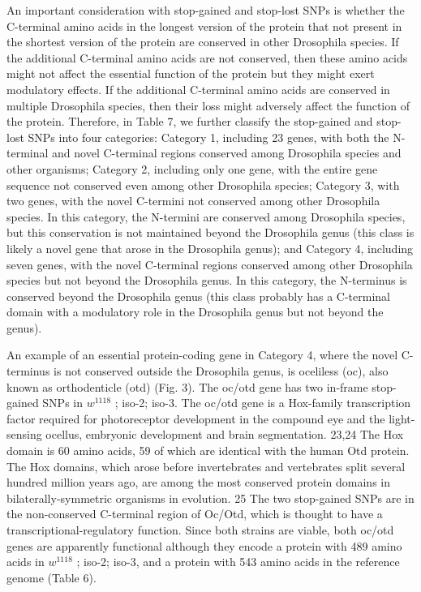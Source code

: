 An important consideration with stop-gained and stop-lost SNPs is whether the C-terminal amino acids in the longest version of the protein that not present in the shortest version of the protein are conserved in other Drosophila species. If the additional C-terminal amino acids are not conserved, then these amino acids might not affect the essential function of the protein but they might exert modulatory effects. If the additional C-terminal amino acids are conserved in multiple Drosophila species, then their loss might adversely affect the function of the protein. Therefore, in Table 7, we further classify the stop-gained and stop-lost SNPs into four categories: Category 1, including 23 genes, with both the N-terminal and novel C-terminal regions conserved among Drosophila species and other organisms; Category 2, including only one gene, with the entire gene sequence not conserved even among other Drosophila species; Category 3, with two genes, with the novel C-termini not conserved among other Drosophila species. In this category, the N-termini are conserved among Drosophila species, but this conservation is not maintained beyond the Drosophila genus (this class is likely a novel gene that arose in the Drosophila genus); and Category 4, including seven genes, with the novel C-terminal regions conserved among other Drosophila species but not beyond the Drosophila genus. In this category, the N-terminus is conserved beyond the Drosophila genus (this class probably has a C-terminal domain with a modulatory role in the Drosophila genus but not beyond the genus).

An example of an essential protein-coding gene in Category 4, where the novel C-terminus is not conserved outside the Drosophila genus, is oceliless (oc), also known as orthodenticle (otd) (Fig. 3). The oc/otd gene has two in-frame stop-gained SNPs in $w^{1118}$ ; iso-2; iso-3. The oc/otd gene is a Hox-family transcription factor required for photoreceptor development in the compound eye and the light-sensing ocellus, embryonic development and brain segmentation. 23,24 The Hox domain is 60 amino acids, 59 of which are identical with the human Otd protein. The Hox domains, which arose before invertebrates and vertebrates split several hundred million years ago, are among the most conserved protein domains in bilaterally-symmetric organisms in evolution. 25 The two stop-gained SNPs are in the non-conserved C-terminal region of Oc/Otd, which is thought to have a transcriptional-regulatory function. Since both strains are viable, both oc/otd genes are apparently functional although they encode a protein with 489 amino acids in $w^{1118}$ ; iso-2; iso-3, and a protein with 543 amino acids in the reference genome (Table 6).

